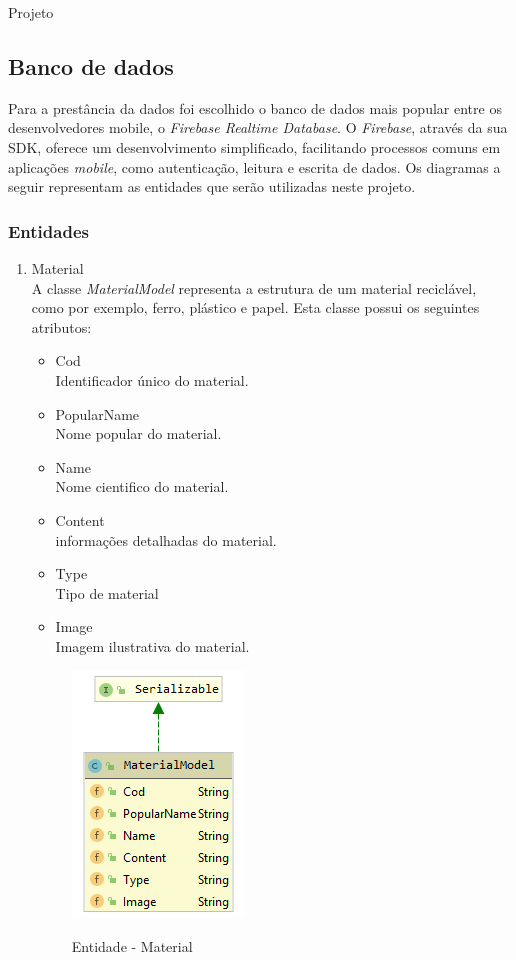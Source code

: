 \documentclass[
	12pt,				%
	openright,			%
	twoside,			%
	a4paper,			%
	english,			%
	french,				%
	spanish,			%
	brazil				%
	]{abntex2}
\begin{document}
\begin{chapter}{Projeto}
\subsection{Banco de dados}
Para a prestância da dados foi escolhido o banco de dados mais popular entre os desenvolvedores mobile, o \textit{Firebase Realtime Database}. O \textit{Firebase}, através da sua SDK, oferece um desenvolvimento simplificado, facilitando processos comuns em aplicações \textit{mobile}, como autenticação, leitura e escrita de dados.
 Os diagramas a seguir representam as entidades que serão utilizadas neste projeto.


\subsubsection{Entidades}
\begin{enumerate}
 \item{Material} \\ A classe \textit{MaterialModel} representa a estrutura de um material reciclável, como por exemplo, ferro, plástico e papel. Esta classe possui os seguintes atributos:
 
 \begin{itemize}
  \item{Cod}\\ Identificador único do material.
   \item{PopularName}\\ Nome popular do material.
     \item{Name}\\ Nome cientifico do material.
       \item{Content}\\ informações detalhadas do material.
         \item{Type}\\ Tipo de material
           \item{Image}\\ Imagem ilustrativa do material.
\end{itemize}
  
\begin{figure}[h]
\centering
   \caption{Entidade - Material}
   \includegraphics[scale=1.0]{media/materialModel.png}
     \label{fig:materialmodel}
\end{figure}



\end{enumerate}
\end{chapter}
\end{document}
